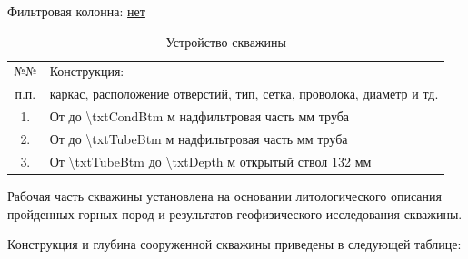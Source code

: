     \bigskip
	
	Фильтровая колонна: \underline{нет}
	

\begin{table}[!h]
	\caption{Устройство скважины}
	\centering
	\begin{tabularx}{\textwidth}{|c|X|}
		\hline 
		№№ & Конструкция: \\ 
		п.п. & каркас, расположение отверстий, тип, сетка, проволока, диаметр и тд. \\ 
		\hline 
		1. & От {\txtOgolovok} до {\num{\txtCondBtm}} м   надфильтровая часть \diameter {\txtCondDiam} мм {\txtCondMaterial} труба \\ 
		\hline 
		2. & От {\txtOgolovok} до {\num{\txtTubeBtm}} м   надфильтровая часть \diameter {\txtTubeDiam} мм {\txtTubeMaterial} труба \\ 
		\hline 
		3. & От {\num{\txtTubeBtm}} до {\num{\txtDepth}} м   открытый ствол {\diameter} 132 мм \\ 
		\hline 
	\end{tabularx} 
\end{table}


Рабочая часть скважины установлена на основании литологического описания пройденных горных пород и результатов геофизического исследования скважины.

\newpage

Конструкция и глубина сооруженной скважины приведены в следующей таблице:

\bigskip

